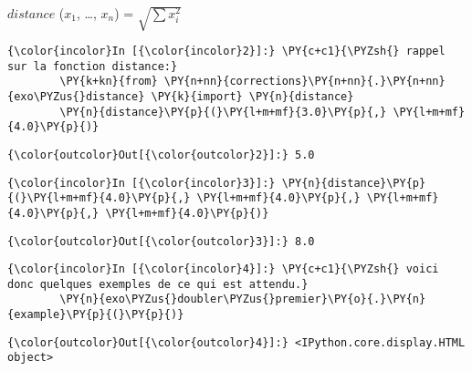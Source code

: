 \(distance\) (\(x_1\), \ldots{}, \(x_n\)) = \(\sqrt{\sum x_i^2}\)

    \begin{Verbatim}[commandchars=\\\{\},frame=single,framerule=0.3mm,rulecolor=\color{cellframecolor}]
{\color{incolor}In [{\color{incolor}2}]:} \PY{c+c1}{\PYZsh{} rappel sur la fonction distance:}
        \PY{k+kn}{from} \PY{n+nn}{corrections}\PY{n+nn}{.}\PY{n+nn}{exo\PYZus{}distance} \PY{k}{import} \PY{n}{distance}
        \PY{n}{distance}\PY{p}{(}\PY{l+m+mf}{3.0}\PY{p}{,} \PY{l+m+mf}{4.0}\PY{p}{)}
\end{Verbatim}


\begin{Verbatim}[commandchars=\\\{\},frame=single,framerule=0.3mm,rulecolor=\color{cellframecolor}]
{\color{outcolor}Out[{\color{outcolor}2}]:} 5.0
\end{Verbatim}
            
    \begin{Verbatim}[commandchars=\\\{\},frame=single,framerule=0.3mm,rulecolor=\color{cellframecolor}]
{\color{incolor}In [{\color{incolor}3}]:} \PY{n}{distance}\PY{p}{(}\PY{l+m+mf}{4.0}\PY{p}{,} \PY{l+m+mf}{4.0}\PY{p}{,} \PY{l+m+mf}{4.0}\PY{p}{,} \PY{l+m+mf}{4.0}\PY{p}{)}
\end{Verbatim}


\begin{Verbatim}[commandchars=\\\{\},frame=single,framerule=0.3mm,rulecolor=\color{cellframecolor}]
{\color{outcolor}Out[{\color{outcolor}3}]:} 8.0
\end{Verbatim}
            
    \begin{Verbatim}[commandchars=\\\{\},frame=single,framerule=0.3mm,rulecolor=\color{cellframecolor}]
{\color{incolor}In [{\color{incolor}4}]:} \PY{c+c1}{\PYZsh{} voici donc quelques exemples de ce qui est attendu.}
        \PY{n}{exo\PYZus{}doubler\PYZus{}premier}\PY{o}{.}\PY{n}{example}\PY{p}{(}\PY{p}{)}
\end{Verbatim}


\begin{Verbatim}[commandchars=\\\{\},frame=single,framerule=0.3mm,rulecolor=\color{cellframecolor}]
{\color{outcolor}Out[{\color{outcolor}4}]:} <IPython.core.display.HTML object>
\end{Verbatim}
            
